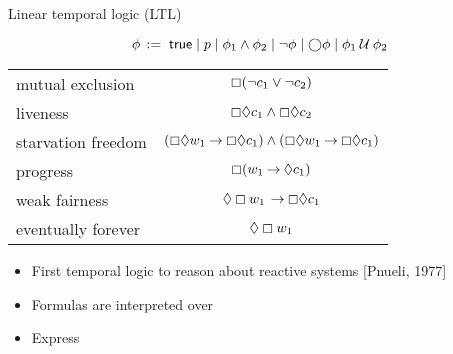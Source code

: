 \documentclass{beamer}
\begin{document}
\begin{slide}{Linear temporal logic (LTL)}\label{s:44}
\small

\[
\phi\, := \; \true \mid p \mid  \phi_1 \wedge \phi_2 \mid \neg \phi \mid \nexts \phi \mid  \phi_1 \until \phi_2 %
\]
\vspace{0.5cm}
\begin{center}
\begin{tabular}{|l|c|}
\hline
mutual exclusion  & $\boxempty (\neg c_1 \vee \neg c_2)$ \\
 liveness & $\boxempty \Diamond c_1 \wedge \boxempty \Diamond c_2$\\
starvation freedom  & $(\boxempty \Diamond w_1 \mathbin{\rightarrow} \boxempty \Diamond c_1) \wedge
(\boxempty \Diamond w_1 \mathbin{\rightarrow} \boxempty \Diamond c_1)$ \\
progress & $\boxempty (w_1 \mathbin{\rightarrow} \Diamond c_1)$\\
weak fairness & $\Diamond \boxempty w_1 \, \mathbin{\rightarrow} \boxempty \Diamond c_1$\\
eventually forever & $\Diamond \boxempty w_1$\\
\hline
\end{tabular}  
\end{center}

\begin{itemize}
\item First temporal logic to reason about reactive systems [Pnueli, 1977]
\item Formulas are interpreted over 
\item Express 
\end{itemize}
\end{slide}
\end{document}
